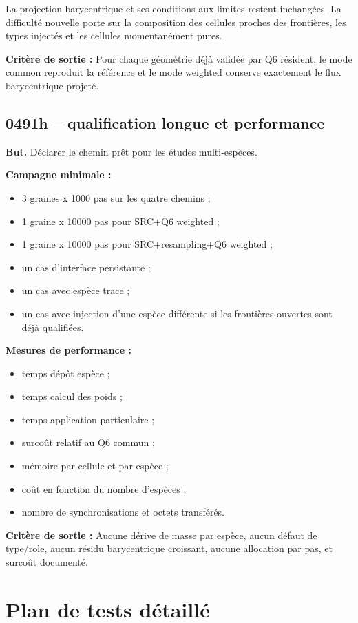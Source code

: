 \documentclass[11pt,a4paper]{article}
\newcommand{\criterion}[1]{\colorbox{softgreen}{\parbox{0.93\linewidth}{\textbf{Critère de sortie :} #1}}}
\begin{document}
La projection barycentrique et ses conditions aux limites restent inchangées. La difficulté nouvelle porte sur la composition des cellules proches des frontières, les types injectés et les cellules momentanément pures.

\criterion{Pour chaque géométrie déjà validée par Q6 résident, le mode common reproduit la référence et le mode weighted conserve exactement le flux barycentrique projeté.}

\subsection{0491h -- qualification longue et performance}

\textbf{But.} Déclarer le chemin prêt pour les études multi-espèces.

\textbf{Campagne minimale :}
\begin{itemize}
  \item 3 graines x 1000 pas sur les quatre chemins ;
  \item 1 graine x 10000 pas pour SRC+Q6 weighted ;
  \item 1 graine x 10000 pas pour SRC+resampling+Q6 weighted ;
  \item un cas d'interface persistante ;
  \item un cas avec espèce trace ;
  \item un cas avec injection d'une espèce différente si les frontières ouvertes sont déjà qualifiées.
\end{itemize}

\textbf{Mesures de performance :}
\begin{itemize}
  \item temps dépôt espèce ;
  \item temps calcul des poids ;
  \item temps application particulaire ;
  \item surcoût relatif au Q6 commun ;
  \item mémoire par cellule et par espèce ;
  \item coût en fonction du nombre d'espèces ;
  \item nombre de synchronisations et octets transférés.
\end{itemize}

\criterion{Aucune dérive de masse par espèce, aucun défaut de type/role, aucun résidu barycentrique croissant, aucune allocation par pas, et surcoût documenté.}

\section{Plan de tests détaillé}
\end{document}
